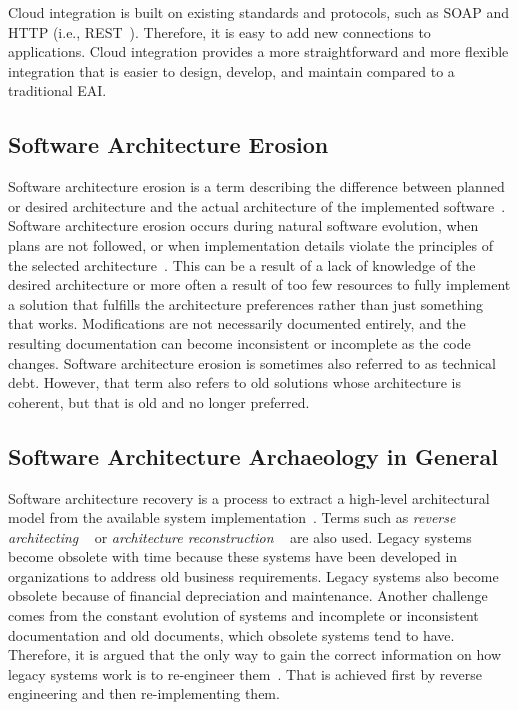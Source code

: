 \documentclass[english, 12pt, a4paper, sci, utf8, a-2b, online, obeyspaces]{aaltothesis}
\begin{document}
Cloud integration is built on existing standards and protocols, such as SOAP and HTTP (i.e., REST~\cite{jin2009research}). Therefore, it is easy to add new connections to applications. Cloud integration provides a more straightforward and more flexible integration that is easier to design, develop, and maintain compared to a traditional EAI.

\subsection{Software Architecture Erosion}
\label{software_architecture_erosion}
Software architecture erosion is a term describing the difference between planned or desired architecture and the actual architecture of the implemented software~\cite{terra2012recommending}. Software architecture erosion occurs during natural software evolution, when plans are not followed, or when implementation details violate the principles of the selected architecture~\cite{perry1992foundations}. This can be a result of a lack of knowledge of the desired architecture or more often a result of too few resources to fully implement a solution that fulfills the architecture preferences rather than just something that works. Modifications are not necessarily documented entirely, and the resulting documentation can become inconsistent or incomplete as the code changes. Software architecture erosion is sometimes also referred to as technical debt. However, that term also refers to old solutions whose architecture is coherent, but that is old and no longer preferred.

\subsection{Software Architecture Archaeology in General}
\label{sec:software_architecture_archaeology_in_general} 
Software architecture recovery is a process to extract a high-level architectural model from the available system implementation~\cite{rasool2007software}. Terms such as \textit{reverse architecting} ~\cite{krikhaar1997reverse} or \textit{architecture reconstruction} ~\cite{ducasse2009software} are also used. Legacy systems become obsolete with time because these systems have been developed in organizations to address old business requirements. Legacy systems also become obsolete because of financial depreciation and maintenance. Another challenge comes from the constant evolution of systems and incomplete or inconsistent documentation and old documents, which obsolete systems tend to have. Therefore, it is argued that the only way to gain the correct information on how legacy systems work is to re-engineer them~\cite{rasool2007software}. That is achieved first by reverse engineering and then re-implementing them.
\end{document}

